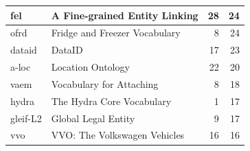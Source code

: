 \begin{table}[h]
\begin{tabular}{|l|l|r|r|}
fel             & A Fine-grained Entity Linking                                                 & 28               & 24             \\ \hline
ofrd            & Fridge and Freezer Vocabulary                                                 & 8                & 24             \\ \hline
dataid          & DataID                                                                        & 17               & 23             \\ \hline
a-loc           & Location Ontology                                                             & 22               & 20             \\ \hline
vaem            & Vocabulary for Attaching                                                      & 8                & 18             \\ \hline
hydra           & The Hydra Core Vocabulary                                                     & 1                & 17             \\ \hline
gleif-L2        & Global Legal Entity                                                           & 9                & 17             \\ \hline
vvo             & VVO: The Volkswagen Vehicles                                                  & 16               & 16             \\ \hline

\end{tabular}
\end{table}
